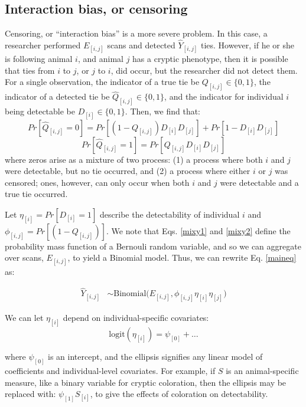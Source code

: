 \documentclass[Afour,sageh,times]{sagej}
\begin{document}
\subsection{Interaction bias, or censoring}
Censoring, or ``interaction bias'' is a more severe problem. In this case, a researcher performed $E_{[i,j]}$ scans and detected $\hat Y_{[i,j]}$ ties. However, if he or she is following animal $i$, and animal $j$ has a cryptic phenotype, then it is possible that ties from $i$ to $j$, or $j$ to $i$,  did occur, but the researcher did not detect them. For a single observation, the indicator of a true tie be $Q_{[i,j]} \in\{0,1\}$, the indicator of a detected tie be $\hat Q_{[i,j]}\in\{0,1\}$, and the indicator for individual $i$ being detectable be $D_{[i]}\in\{0,1\}$. Then, we find that:
  \begin{equation}\label{mixy1}
    Pr[\hat Q_{[i,j]}=0] = Pr[(1-Q_{[i,j]})D_{[i]}D_{[j]}] + Pr[1-D_{[i]}D_{[j]}]
  \end{equation}
  \begin{equation}\label{mixy2}
    Pr[\hat Q_{[i,j]}=1] = Pr[Q_{[i,j]}D_{[i]}D_{[j]}]
  \end{equation}
  where zeros arise as a mixture of two process: (1) a process where both $i$ and $j$ were detectable, but no tie occurred, and (2) a process where either $i$ or $j$ was censored; ones, however, can only occur when both $i$ and $j$ were detectable and a true tie occurred. 
  
Let $\eta_{[i]}=Pr[D_{[i]}=1]$ describe the detectability of individual $i$ and $\phi_{[i,j]}=Pr[(1-Q_{[i,j]})]$. We note that Eqs. \ref{mixy1} and \ref{mixy2} define the probability mass function of a Bernouli random variable, and so we can aggregate over scans, $E_{[i,j]}$, to yield a Binomial model. Thus, we can rewrite Eq. \ref{maineq} as:

\begin{ceqn}
\begin{align}\label{maineq2}
	\hat Y_{[i,j]} &\sim \mathrm{Binomial}\Big(E_{[i,j]}, \phi_{[i,j]}\eta_{[i]}\eta_{[j]} \Big)
\end{align}
\end{ceqn}

We can let $\eta_{[i]}$ depend on individual-specific covariates:
\begin{equation}\label{mixy2}
\text{logit}(\eta_{[i]}) = \psi_{[0]} + \ldots 
\end{equation}

where $\psi_{[0]}$ is an intercept, and the ellipsis signifies any linear model of coefficients and individual-level covariates. For example, if $S$ is an animal-specific measure, like a binary variable for cryptic coloration, then the ellipsis  may be replaced with:  $\psi_{[1]}S_{[i]}$, to give the effects of coloration on detectability.
\end{document}
